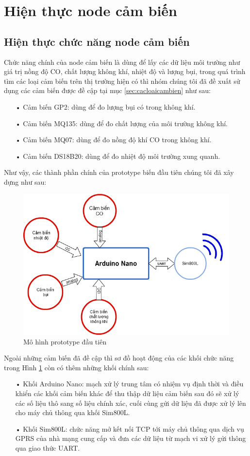 \newpage

\section{Hiện thực node cảm biến}
\subsection{Hiện thực chức năng node cảm biến}
Chức năng chính của node cảm biến là dùng để lấy các dữ liệu môi trường như giá trị nồng độ CO, chất lượng không khí, nhiệt độ và lượng bụi, trong quá trình tìm các loại cảm biến trên thị trường hiện có thì nhóm chúng tôi đã đề xuất sử dụng các cảm biến được đề cập tại mục \ref{sec:cacloaicambien} như sau:
\begin{itemize}
\item[•]Cảm biến GP2: dùng để đo lượng bụi có trong không khí.
\item[•]Cảm  biến MQ135: dùng để đo chất lượng của môi trường không khí.
\item[•]Cảm biến MQ07: dùng để đo nồng độ khí CO trong không khí.
\item[•]Cảm biến DS18B20: dùng để đo nhiệt độ môi trường xung quanh. 
\end{itemize}
Như vậy, các thành phần chính của prototype biến đầu tiên chúng tôi đã xây dựng như sau:
\begin{figure}[H]
\centering    
\includegraphics[width=5in]{prototype_1}
\caption[Mô hình prototype đầu tiên]{Mô hình prototype đầu tiên}
\label{fig:prototype_1}
\end{figure}
Ngoài những cảm biến đã đề cập thì sơ đồ hoạt động của các khối chức năng trong Hình \ref{fig:prototype_1} còn có thêm những khối chính sau:
\begin{itemize}
\item[•] Khối Arduino Nano: mạch xử lý trung tâm có nhiệm vụ định thời và điều khiển các khối cảm biến khác để thu thập dữ liệu cảm biến sau đó sẽ xử lý các số liệu thô sang số liệu chính xác, cuối cùng gửi dữ liệu đã được xử lý lên cho máy chủ thông qua khối Sim800L.
\item[•] Khối Sim800L: chức năng mở kết nối TCP tới máy chủ thông qua dịch vụ GPRS của nhà mạng cung cấp và đưa các dữ liệu từ mạch vi xử lý gửi thông qua giao thức UART.
\end{itemize}

